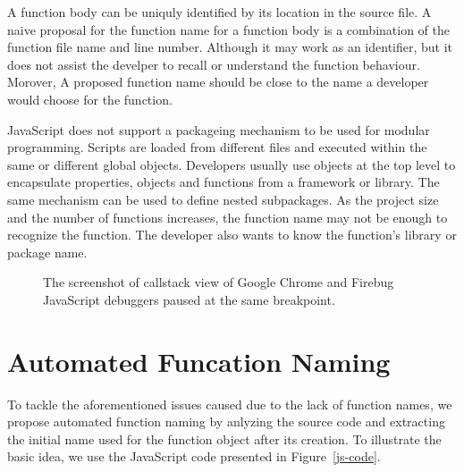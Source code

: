 \documentclass[10pt, preprint]{sigplanconf}
\begin{document}
A function body can be uniquly identified by its location in the source file. A naive proposal for the function name for a function body is a combination of the function file name and line number. Although it may work as an identifier, but it does not assist the develper to recall or understand the function behaviour. Morover, A proposed function name should be close to the name a developer would choose for the function.

JavaScript does not support a packageing mechanism to be used for modular programming. Scripts are loaded from different files and executed within the same or different global objects. Developers usually use objects at the top level to encapsulate properties, objects and functions from a framework or library. The same mechanism can be used to define nested subpackages. As the project size and the number of functions increases, the function name may not be enough to recognize the function. The developer also wants to know the function's library or package name. 

\begin{figure}[htp]
\centerline{
\hfil
{}}
\caption{The screenshot of callstack view of Google Chrome and Firebug JavaScript debuggers paused at the same breakpoint.}
\label{debuggers-callstack}
\end{figure}

\section{Automated Funcation Naming}
    
    To tackle the aforementioned issues caused due to the lack of function names, we propose automated function naming by anlyzing the source code and extracting the initial name used for the function object after its creation. To illustrate the basic idea, we use the JavaScript code presented in Figure~\ref{js-code}. 
    
\end{document}
